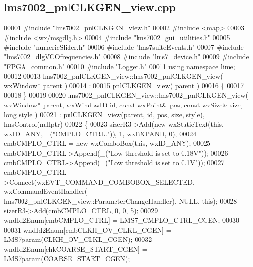 \subsection{lms7002\+\_\+pnl\+C\+L\+K\+G\+E\+N\+\_\+view.\+cpp}
\label{lms7002__pnlCLKGEN__view_8cpp_source}

\begin{DoxyCode}
00001 \textcolor{preprocessor}{#include "lms7002_pnlCLKGEN_view.h"}
00002 \textcolor{preprocessor}{#include <map>}
00003 \textcolor{preprocessor}{#include <wx/msgdlg.h>}
00004 \textcolor{preprocessor}{#include "lms7002_gui_utilities.h"}
00005 \textcolor{preprocessor}{#include "numericSlider.h"}
00006 \textcolor{preprocessor}{#include "lms7suiteEvents.h"}
00007 \textcolor{preprocessor}{#include "lms7002_dlgVCOfrequencies.h"}
00008 \textcolor{preprocessor}{#include "lms7_device.h"}
00009 \textcolor{preprocessor}{#include "FPGA_common.h"}
00010 \textcolor{preprocessor}{#include "Logger.h"}
00011 \textcolor{keyword}{using namespace }lime;
00012 
00013 lms7002_pnlCLKGEN_view::lms7002_pnlCLKGEN_view( wxWindow* parent )
00014 :
00015 pnlCLKGEN_view( parent )
00016 \{
00017 
00018 \}
00019 
00020 lms7002_pnlCLKGEN_view::lms7002_pnlCLKGEN_view( wxWindow* parent, wxWindowID \textcolor{keywordtype}{id}, \textcolor{keyword}{const} wxPoint& pos, \textcolor{keyword}{const} 
      wxSize& size, \textcolor{keywordtype}{long} style )
00021     : pnlCLKGEN_view(parent, id, pos, size, style), lmsControl(nullptr)
00022 \{
00023     sizerR3->Add(\textcolor{keyword}{new} wxStaticText(\textcolor{keyword}{this}, wxID\_ANY, \_(\textcolor{stringliteral}{"CMPLO\_CTRL:"})), 1, wxEXPAND, 0);
00024     cmbCMPLO_CTRL = \textcolor{keyword}{new} wxComboBox(\textcolor{keyword}{this}, wxID\_ANY);
00025     cmbCMPLO_CTRL->Append(\_(\textcolor{stringliteral}{"Low threshold is set to 0.18V"}));
00026     cmbCMPLO_CTRL->Append(\_(\textcolor{stringliteral}{"Low threshold is set to 0.1V"}));
00027     cmbCMPLO_CTRL->Connect(wxEVT\_COMMAND\_COMBOBOX\_SELECTED, wxCommandEventHandler(
      lms7002_pnlCLKGEN_view::ParameterChangeHandler), NULL, \textcolor{keyword}{this});
00028     sizerR3->Add(cmbCMPLO_CTRL, 0, 0, 5);
00029     wndId2Enum[cmbCMPLO_CTRL] = LMS7_CMPLO_CTRL_CGEN;
00030 
00031     wndId2Enum[cmbCLKH_OV_CLKL_CGEN] = LMS7param(CLKH_OV_CLKL_CGEN);
00032     wndId2Enum[chkCOARSE_START_CGEN] = LMS7param(COARSE_START_CGEN);

\end{DoxyCode}
